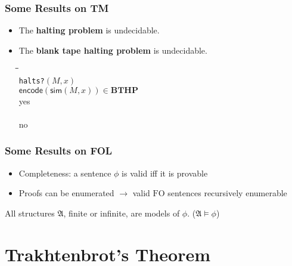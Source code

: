 \documentclass{beamer}
\newcommand{\FO}{\ensuremath{\mathrm{FO}}}
\newcommand{\structa}{\ensuremath{\mathfrak{A}}}
\begin{document}
\begin{frame}
  \frametitle{Some Results on TM}

  \begin{itemize}
    \item The \textbf{halting problem} is undecidable.
    \item The \textbf{blank tape halting problem} is undecidable.
      \begin{center}
        \begin{boxedminipage}{.5\textwidth}
          \begin{tabbing}
            \quad\=\quad\=\quad\=\kill\\
                {\tt halts?}$(M,x)$\\
                 $\mathsf{encode}(\mathsf{sim}(M, x)) \in \mathbf{BTHP}$\\
                \>\>yes\\
                \\
                \>\>no\\
          \end{tabbing}
        \end{boxedminipage}
      \end{center}
  \end{itemize}
  
\end{frame}

\begin{frame}
  \frametitle{Some Results on FOL}

  \begin{itemize}
    \item Completeness: a sentence $\phi$ is valid iff it is provable
    \item Proofs can be enumerated $\longrightarrow$ valid $\FO$ sentences
    recursively enumerable
  \end{itemize}

  \begin{definition}[Validity]
    All structures $\structa$, finite or infinite, are models of $\phi$.
    ($\structa \models \phi$)
  \end{definition}
  
\end{frame}

\section{Trakhtenbrot's Theorem}
\end{document}
